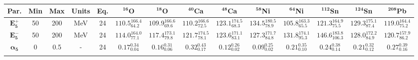 \bgroup
\def\arraystretch{1.5}%
\begin{tabular}{ c c c c c c c c c c c c c c} 
\textbf{Par.} & \textbf{Min} & \textbf{Max} &                \textbf{Units} & \textbf{Eq.}& \textbf{$\mathbf{^{16}}$O}& \textbf{$\mathbf{^{18}}$O}& \textbf{$\mathbf{^{40}}$Ca}& \textbf{$\mathbf{^{48}}$Ca}& \textbf{$\mathbf{^{58}}$Ni}& \textbf{$\mathbf{^{64}}$Ni}& \textbf{$\mathbf{^{112}}$Sn}& \textbf{$\mathbf{^{124}}$Sn}& \textbf{$\mathbf{^{208}}$Pb}\\
 \hline 
$\mathbf{E_{5}^{+}}$ & 50 & 200 & MeV & 24 & $110.5^{166.4}_{64.2}$ & $109.9^{166.6}_{69.6}$ & $110.2^{166.6}_{72.5}$ & $123.1^{174.5}_{68.3}$ & $134.5^{180.5}_{78.9}$ & $105.8^{163.3}_{65.5}$ & $121.3^{164.9}_{75.5}$ & $129.3^{175.1}_{87.4}$ & $119.0^{164.4}_{75.2}$\\ 
$\mathbf{E_{5}^{-}}$ & 50 & 200 & MeV & 24 & $114.0^{164.0}_{77.1}$ & $117.4^{173.1}_{79.8}$ & $121.7^{174.5}_{78.1}$ & $123.6^{171.1}_{83.1}$ & $127.3^{171.7}_{84.8}$ & $131.8^{174.1}_{95.3}$ & $146.6^{183.8}_{106.3}$ & $128.0^{172.2}_{84.9}$ & $120.7^{157.9}_{86.2}$\\ 
$\mathbf{\alpha_{5}}$ & 0 & 0.5 & - & 24 & $0.17^{0.34}_{0.04}$ & $0.16^{0.31}_{0.06}$ & $0.32^{0.43}_{0.17}$ & $0.12^{0.26}_{0.02}$ & $0.09^{0.25}_{0.02}$ & $0.21^{0.35}_{0.10}$ & $0.24^{0.38}_{0.14}$ & $0.21^{0.32}_{0.12}$ & $0.27^{0.39}_{0.16}$\\ 
\\ 
\end{tabular}
\egroup